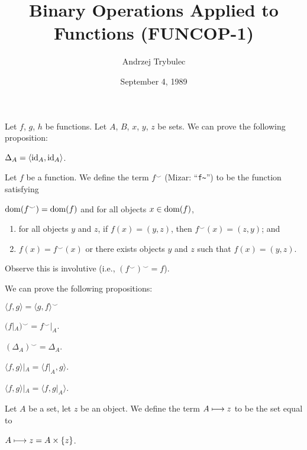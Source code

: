 \documentclass{article}
\title{Binary Operations Applied to Functions (FUNCOP-1)}
\author{Andrzej Trybulec}
\date{September 4, 1989}
\begin{document}
\maketitle

Let $f$, $g$, $h$ be functions. Let $A$, $B$, $x$, $y$, $z$ be sets.
We can prove the following proposition:
\begin{thm}
\item\label{funcop1:1} $\Delta_{A}=\langle\operatorname{id}_{A},\operatorname{id}_{A}\rangle$.
\end{thm}

\begin{definition}
Let $f$ be a function.
We define the term $f^{\smile}$ (Mizar: ``\verb#f~#'') to be the function satisfying
\begin{defn}
\item $\operatorname{dom}(f^{\smile})=\operatorname{dom}(f)$ and for all objects $x\in\operatorname{dom}(f)$,
  \begin{enumerate}[label=(\roman*)]
  \item for all objects $y$ and $z$, if $f(x)=(y,z)$, then $f^{\smile}(x)=(z,y)$;
    and
  \item $f(x)=f^{\smile}(x)$ or there exists objects $y$ and $z$ such
    that $f(x)=(y,z)$.
  \end{enumerate}
\end{defn}
Observe this is involutive (i.e., $(f^{\smile})^{\smile}=f$).
\end{definition}

We can prove the following propositions:
\begin{thm}
\item\label{funcop1:2} $\langle f,g\rangle=\langle g,f\rangle^{\smile}$
\item\label{funcop1:3} $(f|_{A})^{\smile}=f^{\smile}|_{A}$.
\item\label{funcop1:4} $(\Delta_{A})^{\smile}=\Delta_{A}$.
\item\label{funcop1:5} $\langle f,g\rangle|_{A}=\langle f|_{A},g\rangle$.
\item\label{funcop1:6} $\langle f,g\rangle|_{A}=\langle f,g|_{A}\rangle$.
\end{thm}

\begin{definition}
Let $A$ be a set, let $z$ be an object.
We define the term $A\longmapsto z$ to be the set equal to
\begin{defn}
\item $A\longmapsto z= A\times\{z\}$.
\end{defn}
\end{definition}
\end{document}
